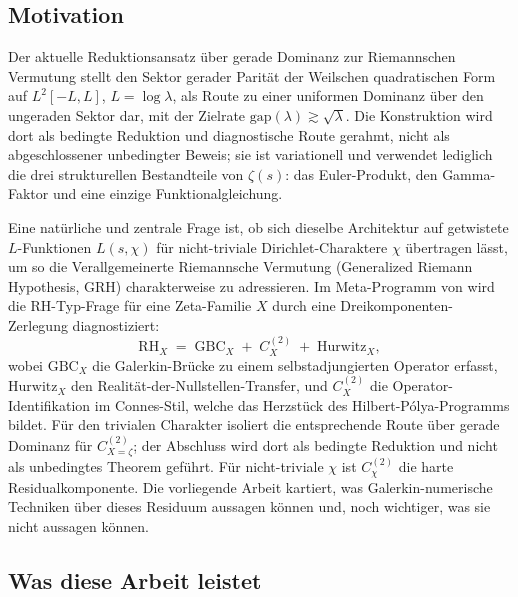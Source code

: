 \documentclass[a4paper,10pt,twocolumn]{article}
\theoremstyle{definition}
\theoremstyle{remark}
\newcommand{\chifn}{\chi}
\begin{document}
\subsection{Motivation}
\label{sec:intro-motivation}

Der aktuelle Reduktionsansatz über gerade Dominanz zur Riemannschen
Vermutung \cite{RH_II} stellt den Sektor gerader Parität der Weilschen
quadratischen Form auf $L^2[-L,L]$, $L=\log\lambda$, als Route zu einer
uniformen Dominanz über den ungeraden Sektor dar, mit der Zielrate
$\mathrm{gap}(\lambda)\gtrsim\sqrt{\lambda}$. Die Konstruktion wird dort
als bedingte Reduktion und diagnostische Route gerahmt, nicht als
abgeschlossener unbedingter Beweis; sie ist variationell und verwendet
lediglich die drei strukturellen Bestandteile von $\zeta(s)$: das
Euler-Produkt, den Gamma-Faktor und eine einzige Funktionalgleichung.

Eine natürliche und zentrale Frage ist, ob sich dieselbe Architektur
auf getwistete $L$-Funktionen $L(s,\chi)$ für nicht-triviale
Dirichlet-Charaktere $\chi$ übertragen lässt, um so die Verallgemeinerte
Riemannsche Vermutung (Generalized Riemann Hypothesis, GRH) charakterweise zu adressieren. Im Meta-Programm
von \cite{MetaGalerkinBridge} wird die RH-Typ-Frage für eine Zeta-Familie
$X$ durch eine Dreikomponenten-Zerlegung diagnostiziert:
\begin{equation}
\label{eq:three-component}
  \mathrm{RH}_X
    \;=\;
  \mathrm{GBC}_X \;+\; C^{(2)}_X \;+\; \mathrm{Hurwitz}_X,
\end{equation}
wobei $\mathrm{GBC}_X$ die Galerkin-Brücke zu einem selbstadjungierten
Operator erfasst, $\mathrm{Hurwitz}_X$ den Realität-der-Nullstellen-Transfer, und
$C^{(2)}_X$ die Operator-Identifikation im Connes-Stil, welche das Herzstück des
Hilbert-P\'olya-Programms bildet. Für den trivialen Charakter isoliert
\cite{RH_II} die entsprechende Route über gerade Dominanz für
$C^{(2)}_{X=\zeta}$; der Abschluss wird dort als bedingte Reduktion und
nicht als unbedingtes Theorem geführt. Für nicht-triviale $\chi$ ist
$C^{(2)}_{\chifn}$ die harte Residualkomponente. Die vorliegende Arbeit
kartiert, was Galerkin-numerische Techniken über dieses Residuum aussagen
können und, noch wichtiger, was sie nicht aussagen können.

\subsection{Was diese Arbeit leistet}
\label{sec:intro-contribution}
\end{document}
